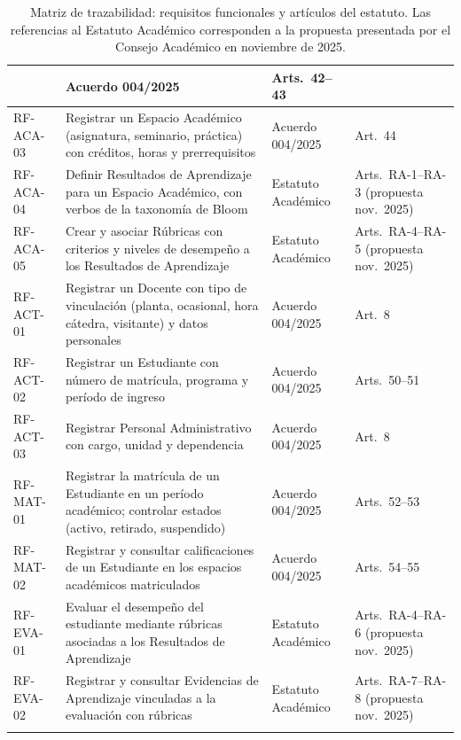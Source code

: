 \begin{longtable}{C{1.5cm} L{5cm} C{2cm} L{3.5cm}}
             & Acuerdo 004/2025 & Arts.~42--43 \\
  \midrule
  RF-ACA-03 & Registrar un Espacio Académico (asignatura, seminario,
               práctica) con créditos, horas y prerrequisitos
             & Acuerdo 004/2025 & Art.~44 \\
  \midrule
  RF-ACA-04 & Definir Resultados de Aprendizaje para un Espacio
               Académico, con verbos de la taxonomía de Bloom
             & Estatuto Académico & Arts.~RA-1--RA-3 (propuesta nov.~2025) \\
  \midrule
  RF-ACA-05 & Crear y asociar Rúbricas con criterios y niveles de
               desempeño a los Resultados de Aprendizaje
             & Estatuto Académico & Arts.~RA-4--RA-5 (propuesta nov.~2025) \\
  \midrule
  RF-ACT-01 & Registrar un Docente con tipo de vinculación (planta,
               ocasional, hora cátedra, visitante) y datos personales
             & Acuerdo 004/2025 & Art.~8 \\
  \midrule
  RF-ACT-02 & Registrar un Estudiante con número de matrícula,
               programa y período de ingreso
             & Acuerdo 004/2025 & Arts.~50--51 \\
  \midrule
  RF-ACT-03 & Registrar Personal Administrativo con cargo,
               unidad y dependencia
             & Acuerdo 004/2025 & Art.~8 \\
  \midrule
  RF-MAT-01 & Registrar la matrícula de un Estudiante en un período
               académico; controlar estados (activo, retirado, suspendido)
             & Acuerdo 004/2025 & Arts.~52--53 \\
  \midrule
  RF-MAT-02 & Registrar y consultar calificaciones de un Estudiante
               en los espacios académicos matriculados
             & Acuerdo 004/2025 & Arts.~54--55 \\
  \midrule
  RF-EVA-01 & Evaluar el desempeño del estudiante mediante rúbricas
               asociadas a los Resultados de Aprendizaje
             & Estatuto Académico & Arts.~RA-4--RA-6 (propuesta nov.~2025) \\
  \midrule
  RF-EVA-02 & Registrar y consultar Evidencias de Aprendizaje
               vinculadas a la evaluación con rúbricas
             & Estatuto Académico & Arts.~RA-7--RA-8 (propuesta nov.~2025) \\
  \bottomrule
  \caption{Matriz de trazabilidad: requisitos funcionales y artículos
    del estatuto. Las referencias al Estatuto Académico corresponden
    a la propuesta presentada por el Consejo Académico en noviembre
    de 2025.}
  \label{tab:trazabilidad}
\end{longtable}

